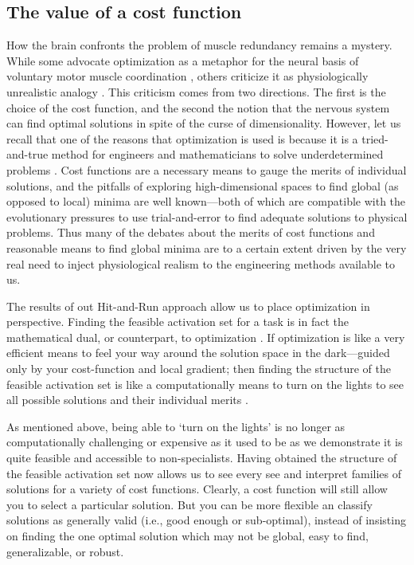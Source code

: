 \subsection*{The value of a cost function}

How the brain confronts the problem of muscle redundancy remains a mystery. While some advocate optimization as a metaphor for the neural basis of voluntary motor muscle coordination  \cite{scott2004optimal,todorov2002optimal}, others criticize  it as physiologically unrealistic analogy \cite{deRugy2012habitual,loeb2012optimal}. This criticism comes from two directions. The first is the choice of the cost function, and the second the notion that the nervous system can find optimal solutions in spite of the curse of dimensionality. However, let us recall that one of the reasons that optimization is used is because it is a tried-and-true method for engineers and mathematicians to solve underdetermined problems \cite{valero-cuevas2009computational}.  Cost functions are  a necessary means to gauge the merits of individual solutions, and the pitfalls of exploring high-dimensional spaces to find global (as opposed to local) minima are well known---both of which are compatible with the evolutionary pressures to use trial-and-error to find adequate solutions to physical problems. Thus many of the debates about the merits of cost functions \cite{Prilutsky2000Muscle,crowninshield1981physiologically} and reasonable means to find  global minima \cite{shadmehr2012biological} are to a certain extent driven by the very real need to inject physiological realism to the engineering methods available to us.

The results of out Hit-and-Run approach allow us to place optimization in perspective. Finding the feasible activation set for a task is in fact the mathematical dual, or counterpart, to optimization \cite{deBerg2008computational,Chvatal1983Linear}. If optimization is like a very efficient means to feel your way around the solution space in the dark---guided only by your cost-function and local gradient; then  finding the structure of the feasible activation set is like a computationally means to turn on the lights to see all possible solutions and their individual merits \cite{valero-cuevas2015fundamentals}.

As mentioned above, being able to  `turn on the lights' is no longer as computationally challenging or expensive as it used to be as we demonstrate it is quite feasible and accessible to non-specialists. Having obtained the structure of the feasible activation set now allows us to see every see and interpret  families of solutions for a variety of cost functions. Clearly, a cost function will still allow you to select a particular solution. But you can  be more flexible an classify solutions as generally valid (i.e., good enough or sub-optimal),  instead of insisting on finding the one optimal solution which may not be global, easy to find, generalizable, or robust.


